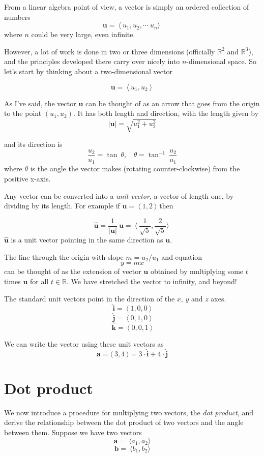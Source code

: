 \documentclass[11pt, oneside]{article}
\begin{document}
From a linear algebra point of view, a vector is simply an ordered collection of numbers
\[  \mathbf{u} =  \ \langle \ u_1, u_2, \cdots \ u_n \rangle \  \]
where $n$ could be very large, even infinite.  

However, a lot of work is done in two or three dimensions (officially $\mathbb{R}^2$ and $\mathbb{R}^3$), and the principles developed there carry over nicely into $n$-dimensional space.  So let's start by thinking about a two-dimensional vector

\[ \mathbf{u} =  \ \langle \ u_1, u_2 \ \rangle \  \]

As I've said, the vector $\mathbf{u}$ can be thought of as an arrow that goes from the origin to the point $(u_1,u_2)$.  It has both length and direction, with the length given by
\[ |\mathbf{u} | = \sqrt{u_1^2 + u_2^2} \]

and its direction is
\[ \frac{u_2}{u_1} = \tan \ \theta, \ \ \ \  \theta = \tan^{-1} \ \frac{u_2}{u_1} \]
where $\theta$ is the angle the vector makes (rotating counter-clockwise) from the positive x-axis.

Any vector can be converted into a \emph{unit vector}, a vector of length one, by dividing by its length.  For example if $\mathbf{u} =\ \langle \ 1,2 \ \rangle$ then 

\[ \hat{\mathbf{u}} =  \frac{1}{|\mathbf{u}|}\ \mathbf{u} = \ \langle \ \frac{1}{\sqrt{5}}, \frac{2}{\sqrt{5}} \rangle \ \]
$\hat{\mathbf{u}}$ is a unit vector pointing in the same direction as $\mathbf{u}$.

The line through the origin with slope $m = u_2/u_1$ and equation
\[ y = mx \] 
can be thought of as the extension of vector $\mathbf{u}$ obtained by multiplying some $t$ times $\mathbf{u}$ for all $t \in \mathbb{R}$.  We have stretched the vector to infinity, and beyond!

The standard unit vectors point in the direction of the $x$, $y$ and $z$ axes.
\[ \hat{\mathbf{i}} = \ \langle \ 1, 0, 0 \ \rangle \]
\[ \hat{\mathbf{j}} = \ \langle \ 0, 1, 0 \ \rangle \]
\[ \hat{\mathbf{k}} = \ \langle \ 0, 0, 1 \ \rangle \]

We can write the vector using these unit vectors as
\[ \mathbf{a} = \langle \ 3 , 4 \ \rangle = 3 \cdot \hat{\mathbf{i}} + 4 \cdot \hat{\mathbf{j}}  \]

\section*{Dot product}
We now introduce a procedure for multiplying two vectors, the \emph{dot product}, and derive the relationship between the dot product of two vectors and the angle between them.  Suppose we have two vectors
\[ \mathbf{a} = \ \langle a_1,a_2 \rangle \]
\[ \mathbf{b} = \ \langle b_1,b_2 \rangle \]
\end{document}
